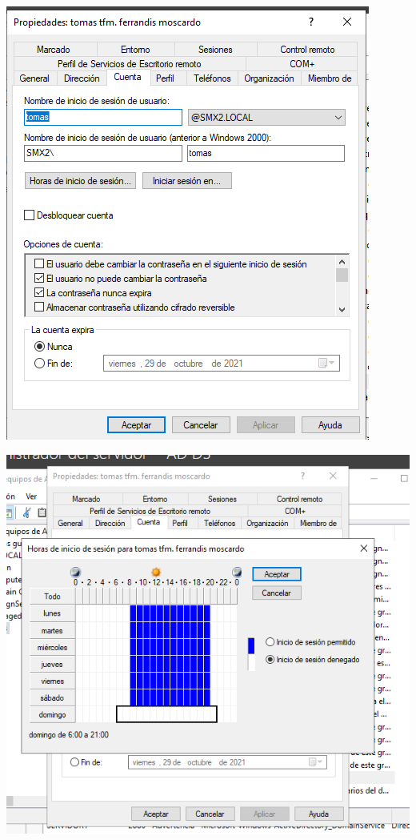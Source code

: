 \documentclass[
  a4paper,
]{article}
\begin{document}
\includegraphics{png/usuaris7.png}

\includegraphics{png/usuaris8.png}
\end{document}
